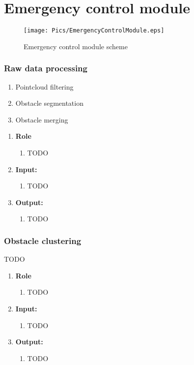 \section{Emergency control module}\label{ch:EmergencyControlModule}

\begin{figure}[h]
    \centering
    \texttt{[image: Pics/EmergencyControlModule.eps]}
    \caption{Emergency control module scheme}
    \label{fig:EmergencyControlModule}
\end{figure}

\subsubsection{Raw data processing}
\begin{enumerate}[1.]
	\item Pointcloud filtering
	\item Obstacle segmentation
	\item Obstacle merging
\end{enumerate}
\begin{enumerate}[]
	\item \textbf{Role}
	    \begin{enumerate}[]
		    \item TODO
		\end{enumerate}
	\item \textbf{Input:}
	    \begin{enumerate}[1.]
		\item TODO
		\end{enumerate}	
	\item \textbf{Output:}
	    \begin{enumerate}[1.]
		\item TODO
		\end{enumerate}
\end{enumerate}

\subsubsection{Obstacle clustering}
TODO
\begin{enumerate}[]
	\item \textbf{Role}
	    \begin{enumerate}[]
		    \item TODO
		\end{enumerate}
	\item \textbf{Input:}
	    \begin{enumerate}[1.]
		\item TODO
		\end{enumerate}	
	\item \textbf{Output:}
	    \begin{enumerate}[1.]
		\item TODO
		\end{enumerate}
\end{enumerate}

